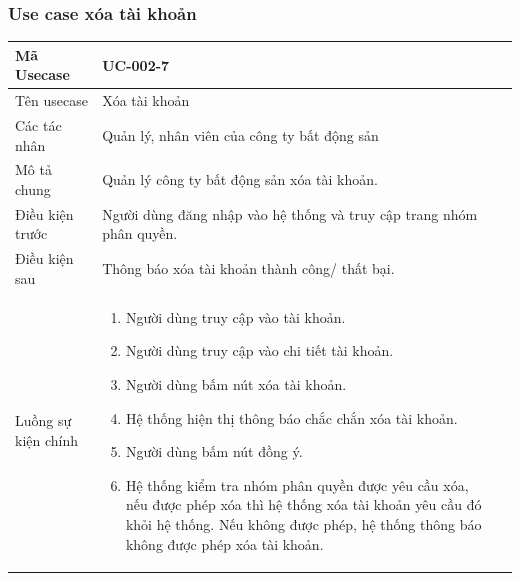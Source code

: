 \documentclass[12pt,a4paper]{article}
\begin{document}
    \subsubsection*{Use case xóa tài khoản }
    \begin{table}[H]
        \centering
        \begin{tabular}{|p{3.5cm}|p{11.5cm}|c|}
            \hline
            Mã Usecase      & UC-002-7                                                             \\
            \hline
            Tên usecase     & Xóa tài khoản                                                        \\
            \hline
            Các tác nhân    & Quản lý, nhân viên của công ty bất động sản                          \\
            \hline
            Mô tả chung     & Quản lý công ty bất động sản xóa tài khoản.                          \\
            \hline
            Điều kiện trước & Người dùng đăng nhập vào hệ thống và truy cập trang nhóm phân quyền. \\
            \hline
            Điều kiện sau   & Thông báo xóa tài khoản thành công/ thất bại.                        \\
            \hline
            Luồng sự kiện chính & \vspace{-.8cm}\begin{enumerate}
                                                    \item Người dùng truy cập vào tài khoản.
                                                    \item Người dùng truy cập vào chi tiết tài khoản.
                                                    \item  Người dùng bấm nút xóa tài khoản.
                                                    \item  Hệ thống hiện thị thông báo chắc chắn xóa tài khoản.
                                                    \item  Người dùng bấm nút đồng ý.
                                                    \item Hệ thống kiểm tra nhóm phân quyền được yêu cầu xóa, nếu được phép xóa thì hệ thống xóa tài khoản yêu cầu đó khỏi hệ thống. Nếu không được phép, hệ thống thông báo không được phép xóa tài khoản.
            \end{enumerate}
            \\

\end{tabular}
\end{table}
\end{document}
